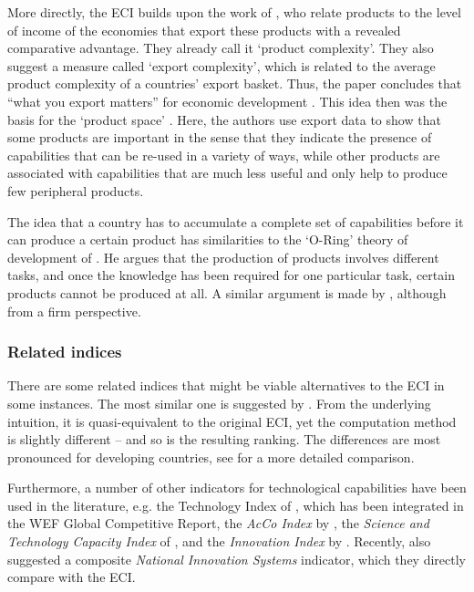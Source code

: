 \documentclass[11pt,a4paper]{article}
\begin{document}
More directly, the ECI builds upon the work of \citet{Hausmann:2007hj}, who relate products to the level of income of the economies that export these products with a revealed comparative advantage.
They already call it `product complexity'. 
They also suggest a measure called `export complexity', which is related to the average product complexity of a countries' export basket.
Thus, the paper concludes that ``what you export matters'' for economic development \citep[p. 1]{Hausmann:2007hj}.
This idea then was the basis for the `product space' \citep{Hidalgo:2007cp}.
Here, the authors use export data to show that some products are important in the sense that they indicate the presence of capabilities that can be re-used in a variety of ways, while other products are associated with capabilities that are much less useful and only help to produce few peripheral products.

The idea that a country has to accumulate a complete set of capabilities before it can produce a certain product has similarities to the `O-Ring' theory of development of \citet{Kremer:1993cs}.
He argues that the production of products involves different tasks, and once the knowledge has been required for one particular task, certain products cannot be produced at all. 
A similar argument is made by \citet{Sutton:2012uka}, although from a firm perspective.

\subsubsection{Related indices}
There are some related indices that might be viable alternatives to the ECI in some instances.
The most similar one is suggested by \citet{Tacchella:2012fx, Tacchella:2013ko}.
From the underlying intuition, it is quasi-equivalent to the original ECI, yet the computation method is slightly different -- and so is the resulting ranking.
The differences are most pronounced for developing countries, see \citet{Cristelli:2013hj} for a more detailed comparison.

Furthermore, a number of other indicators for technological capabilities have been used in the literature, e.g.
the Technology Index of \citet{Furman:2002gu}, which has been integrated in the WEF Global Competitive Report,  
the \textit{AcCo Index} by \citet{Archibugi:2004bp},
the \textit{Science and Technology Capacity Index} of \citet{Wagner:2001up}, and
the \textit{Innovation Index} by \citet{Khayyat:2015ks}.
Recently, \citet{Lee:2019cu} also suggested a composite \textit{National Innovation Systems} indicator, which they directly compare with the ECI.
\end{document}
